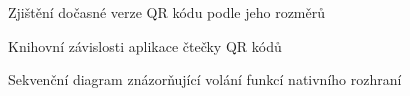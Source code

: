 \begin{figure}[H]
  \begin{center}
    \caption{Zjištění dočasné verze QR kódu podle jeho rozměrů}
    \label{DeterminingTheVersionOfQRCode}
  \end{center}
\end{figure}

\begin{figure}[H]
  \begin{center}
    \caption{Knihovní závislosti aplikace čtečky QR kódů}
    \label{QRReaderApplicationLibraryDependency}
  \end{center}
\end{figure}

\begin{figure}[H]
  \begin{center}
    \caption{Sekvenční diagram znázorňující volání funkcí nativního rozhraní}
    \label{QRReaderApplicationNativeCalls}
  \end{center}
\end{figure}

